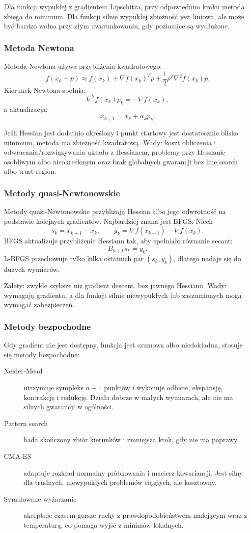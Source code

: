 Dla funkcji wypukłej z gradientem Lipschitza, przy odpowiednim kroku metoda zbiega do minimum. Dla funkcji silnie wypukłej zbieżność jest liniowa, ale może być bardzo wolna przy złym uwarunkowaniu, gdy poziomice są wydłużone.

\subsubsection{Metoda Newtona}

Metoda Newtona używa przybliżenia kwadratowego:
\[
f(x_k+p)\approx f(x_k)+\nabla f(x_k)^Tp+\frac{1}{2}p^T\nabla^2f(x_k)p.
\]
Kierunek Newtona spełnia:
\[
\nabla^2 f(x_k)p_k=-\nabla f(x_k),
\]
a aktualizacja:
\[
x_{k+1}=x_k+\alpha_k p_k.
\]

Jeśli Hessian jest dodatnio określony i punkt startowy jest dostatecznie blisko minimum, metoda ma zbieżność kwadratową. Wady: koszt obliczenia i odwracania/rozwiązywania układu z Hessianem, problemy przy Hessianie osobliwym albo nieokreślonym oraz brak globalnych gwarancji bez line search albo trust region.

\subsubsection{Metody quasi-Newtonowskie}

Metody quasi-Newtonowskie przybliżają Hessian albo jego odwrotność na podstawie kolejnych gradientów. Najbardziej znana jest BFGS. Niech
\[
s_k=x_{k+1}-x_k,\qquad y_k=\nabla f(x_{k+1})-\nabla f(x_k).
\]
BFGS aktualizuje przybliżenie Hessianu tak, aby spełniało równanie secant:
\[
B_{k+1}s_k=y_k.
\]
L-BFGS przechowuje tylko kilka ostatnich par $(s_k,y_k)$, dlatego nadaje się do dużych wymiarów.

Zalety: zwykle szybsze niż gradient descent, bez jawnego Hessianu. Wady: wymagają gradientu, a dla funkcji silnie niewypukłych lub zaszumionych mogą wymagać zabezpieczeń.

\subsubsection{Metody bezpochodne}

Gdy gradient nie jest dostępny, funkcja jest szumowa albo niedokładna, stosuje się metody bezpochodne:
\begin{description}
  \item[Nelder-Mead] utrzymuje sympleks $n+1$ punktów i wykonuje odbicie, ekspansję, kontrakcję i redukcję. Działa dobrze w małych wymiarach, ale nie ma silnych gwarancji w ogólności.
  \item[Pattern search] bada skończony zbiór kierunków i zmniejsza krok, gdy nie ma poprawy.
  \item[CMA-ES] adaptuje rozkład normalny próbkowania i macierz kowariancji. Jest silny dla trudnych, niewypukłych problemów ciągłych, ale kosztowny.
  \item[Symulowane wyżarzanie] akceptuje czasem gorsze ruchy z prawdopodobieństwem malejącym wraz z temperaturą, co pomaga wyjść z minimów lokalnych.
\end{description}

